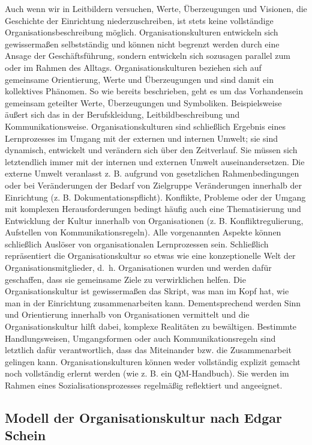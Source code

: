 \documentclass[
  letterpaper,
]{book}
\begin{document}
Auch wenn wir in Leitbildern versuchen, Werte, Überzeugungen und
Visionen, die Geschichte der Einrichtung niederzuschreiben, ist stets
keine vollständige Organisationsbeschreibung möglich.
Organisationskulturen entwickeln sich gewissermaßen selbstständig und
können nicht begrenzt werden durch eine Ansage der Geschäftsführung,
sondern entwickeln sich sozusagen parallel zum oder im Rahmen des
Alltags. Organisationskulturen beziehen sich auf gemeinsame
Orientierung, Werte und Überzeugungen und sind damit ein kollektives
Phänomen. So wie bereits beschrieben, geht es um das Vorhandensein
gemeinsam geteilter Werte, Überzeugungen und Symboliken. Beispielsweise
äußert sich das in der Berufskleidung, Leitbildbeschreibung und
Kommunikationsweise. Organisationskulturen sind schließlich Ergebnis
eines Lernprozesses im Umgang mit der externen und internen Umwelt; sie
sind dynamisch, entwickelt und verändern sich über den Zeitverlauf. Sie
müssen sich letztendlich immer mit der internen und externen Umwelt
auseinandersetzen. Die externe Umwelt veranlasst z. B. aufgrund von
gesetzlichen Rahmenbedingungen oder bei Veränderungen der Bedarf von
Zielgruppe Veränderungen innerhalb der Einrichtung (z. B.
Dokumentationspflicht). Konflikte, Probleme oder der Umgang mit
komplexen Herausforderungen bedingt häufig auch eine Thematisierung und
Entwicklung der Kultur innerhalb von Organisationen (z. B.
Konfliktregulierung, Aufstellen von Kommunikationsregeln). Alle
vorgenannten Aspekte können schließlich Auslöser von organisationalen
Lernprozessen sein. Schließlich repräsentiert die Organisationskultur so
etwas wie eine konzeptionelle Welt der Organisationsmitglieder, d.~h.
Organisationen wurden und werden dafür geschaffen, dass sie gemeinsame
Ziele zu verwirklichen helfen. Die Organisationskultur ist gewissermaßen
das Skript, was man im Kopf hat, wie man in der Einrichtung
zusammenarbeiten kann. Dementsprechend werden Sinn und Orientierung
innerhalb von Organisationen vermittelt und die Organisationskultur
hilft dabei, komplexe Realitäten zu bewältigen. Bestimmte
Handlungsweisen, Umgangsformen oder auch Kommunikationsregeln sind
letztlich dafür verantwortlich, dass das Miteinander bzw. die
Zusammenarbeit gelingen kann. Organisationskulturen können weder
vollständig explizit gemacht noch vollständig erlernt werden (wie z. B.
ein QM-Handbuch). Sie werden im Rahmen eines Sozialisationsprozesses
regelmäßig reflektiert und angeeignet.

\subsection{Modell der Organisationskultur nach Edgar
Schein}\label{modell-der-organisationskultur-nach-edgar-schein}
\end{document}

